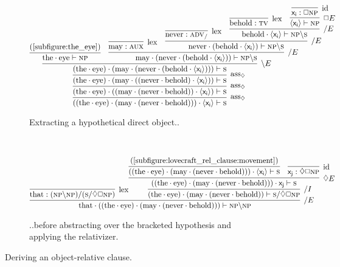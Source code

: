 \begin{figure}
	\centering
	\begin{subfigure}{1\textwidth}
		\smaller
		\[
						\infer[\rulestyle{ass}_{\diamond}]{((\w{the}\sbind\w{eye})\sbind(\w{may}\sbind(\w{never}\sbind\w{behold})))\sbind\bracket{\term{x_i}}\vdash \s}{
				\infer[\rulestyle{ass}_{\diamond}]{(\w{the}\sbind\w{eye})\sbind((\w{may}\sbind(\w{never}\sbind\w{behold}))\sbind\bracket{\term{x_i}})\vdash \s}{
					\infer[\rulestyle{ass}_{\diamond}]{(\w{the}\sbind\w{eye})\sbind(\w{may}\sbind((\w{never}\sbind\w{behold})\sbind\bracket{\term{x_i}}))\vdash \s}{
						\infer[\divleft E]{(\w{the}\sbind\w{eye})\sbind(\w{may}\sbind(\w{never}\sbind(\w{behold}\sbind\bracket{\term{x_i}})))\vdash \s}{
							\infer{\w{the}\sbind\w{eye} \vdash \np}{\text{(\ref{subfigure:the_eye})}}
							&
							\infer[\divright E]{\w{may}\sbind(\w{never}\sbind(\w{behold}\sbind\bracket{\term{x_i}})) \vdash \np\divleft\s}{
								\infer[\Lex]{\w{may} : \gtype{aux}}{}
								&
								\infer[\divright E]{\w{never}\sbind(\w{behold}\sbind\bracket{\term{x_i}}) \vdash \np\divleft\s}{
									\infer[\Lex]{\w{never}:\smallgtype{adv}_{\divright}}{}
									&
									\infer[\divright E]{\w{behold}\sbind{\bracket{\term{x_i}}} \vdash \np\divleft\s}{
										\infer[\Lex]{\w{behold}: \gtype[l]{tv}}{}
										&
										\infer[\Box E]{\bracket{\term{x_i}} \vdash \np}{
											\infer[\Ax]{\term{x_i} : \Box \np}{}
										}
									}
								}
							}
						}
					}
				}
			}
		\]
		\caption{Extracting a hypothetical direct object..}
		\label{subfigure:lovecraft_rel_clause:movement}
	\end{subfigure}\\[\smallsep]
	\begin{subfigure}{1\textwidth}
		\smaller
		\[
			\infer[\divright E]{\w{that}\sbind((\w{the}\sbind\w{eye})\sbind(\w{may}\sbind(\w{never}\sbind\w{behold}))) \vdash \np\divleft\np}{
				\infer[\Lex]{\w{that} : (\np\divleft\np)\divright(\s\divright\diamond\Box\np)}{}
				&
				\hspace{-10pt}\infer[\divright I]{(\w{the}\sbind\w{eye})\sbind(\w{may}\sbind(\w{never}\sbind\w{behold})) \vdash \s\divright\diamond\Box\np}{
					\infer[\diamond E]{((\w{the}\sbind\w{eye})\sbind(\w{may}\sbind(\w{never}\sbind\w{behold})))\sbind\term{x_j}\vdash \s}{
						\infer{((\w{the}\sbind\w{eye})\sbind(\w{may}\sbind(\w{never}\sbind\w{behold})))\sbind\bracket{\term{x_i}}\vdash \s}{\text{(\ref{subfigure:lovecraft_rel_clause:movement})}}
						&
						\infer[\Ax]{\term{x_j}: \diamond\Box \np}{}
					}
				}
			}
		\]
		\caption{..before abstracting over the bracketed hypothesis and applying the relativizer.}
		\label{subfigure:lovecraft_rel_clause:substitution}
	\end{subfigure}
	\caption{Deriving an object-relative clause.}
	\label{figure:lovecract_rel_clause}
\end{figure}


